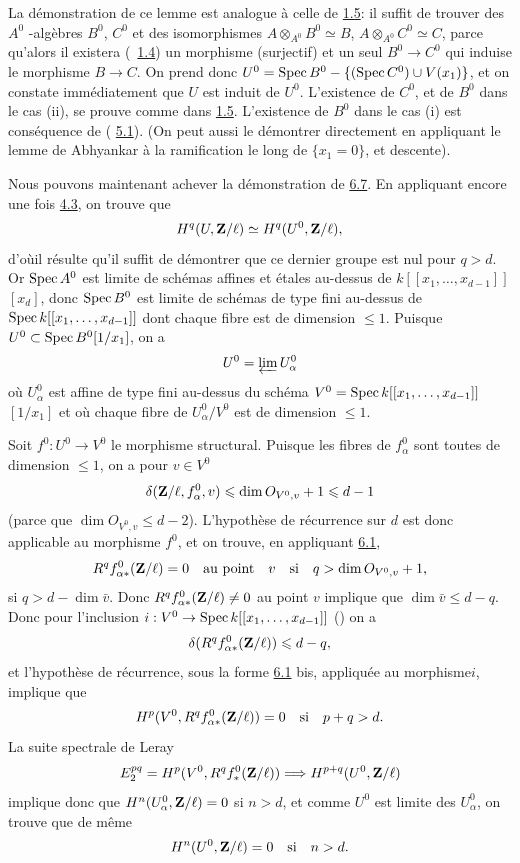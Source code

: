 \documentclass[10pt]{../fichiers-configuration-latex/smfart}
\begin{document}
La démonstration de ce lemme est analogue à celle de \hyperref[XIX.lem1.5]{1.5}:
il suffit de trouver des $A^{0}$ -algèbres $B^{0}$, $C^{0}$ et des
isomorphismes $A\otimes_{A^{0}}B^{0}\simeq B$,
$A\otimes_{A^{0}}C^{0}\simeq C$, parce qu'alors il existera
(\cite{SGA4-19:3}~\hyperref[XIX.subsec1.4]{1.4}) un morphisme (surjectif) et un seul
$B^{0}\rightarrow C^{0}$ qui induise le morphisme $B\rightarrow C$. On
prend donc $U^{0}=\operatorname{Spec} B^{0}-\{(\operatorname{Spec} C^{0})\cup V(x_{1})\}$, et on
constate immédiatement que $U$ est induit de $U^{0}$. L'existence de
$C^{0}$, et de $B^{0}$ dans le cas (ii), se prouve comme dans
\hyperref[XIX.lem1.5]{1.5}. L'existence de $B^{0}$ dans le cas (i) est
conséquence de (\cite{SGA4-19:3} 
\hyperref[XIX.thm5.1]{5.1}). (On peut aussi le démontrer directement en
appliquant le lemme 
de Abhyankar à la ramification le long de $\{x_{1}=0\}$, et descente).

Nous pouvons maintenant achever la démonstration de
\hyperref[XIX.lem6.7]{6.7}. En appliquant 
encore une fois \hyperref[XIX.cor4.3]{4.3}, on trouve que
$$
H^{q}(U,\mathbf{Z}/\ell)\simeq H^{q}(U^{0},\mathbf{Z}/\ell){},
$$
d'où\pageoriginale il résulte qu'il suffit de démontrer que ce dernier
groupe est nul pour $q>d$. Or $\operatorname{Spec} A^{0}$ est limite de schémas
affines et étales au-dessus de $k[[x_{1},\ldots,x_{d-1}]]$ $[x_{d}]$,
donc $\operatorname{Spec} B^{0}$ est limite de schémas de type fini au-dessus de
$\operatorname{Spec} k[[x_{1},\dots,x_{d-1}]]$ dont chaque fibre est de dimension
$\leq 1$. Puisque $U^{0}\subset \operatorname{Spec} B^{0}[1/x_{1}]$, on a
$$
U^{0}=\varprojlim U^{0}_{\alpha}
$$
où $U^{0}_{\alpha}$ est affine de type fini au-dessus du schéma
$V^{0}=\operatorname{Spec} k[[x_{1},\dots, x_{d-1}]]$ $[1/x_{1}]$ et où chaque
fibre de $U^{0}_{\alpha}/V^{0}$ est de dimension $\leq 1$.

Soit $f^{0}:U^{0}\rightarrow V^{0}$ le morphisme structural. Puisque
les fibres de $f^{0}_{\alpha}$ sont toutes de dimension $\leq 1$, on a
pour $v\in V^{0}$
$$
\delta(\mathbf{Z}/\ell, f^{0}_{\alpha},v)\leqslant \dim O_{V^{0},v}+1\leqslant
d-1
$$
(parce que $\dim O_{V^{0},v}\leq d-2$). L'hypothèse de récurrence sur
$d$ est donc applicable au morphisme $f^{0}$, et on trouve, en
appliquant \hyperref[XIX.thm6.1]{6.1},
$$
R^{q}f^{0}_{\alpha\ast}(\mathbf{Z}/\ell)=0\quad\text{\rm au
point}\quad v\quad\text{\rm si}\quad q>\dim O_{V^{0},v}+1{},
$$
\ie si $q>d-\dim\bar{v}$. Donc $R^{q}f^{0}_{\alpha
\ast}(\mathbf{Z}/\ell)\neq 0$ au point $v$ implique que $\dim
\bar{v}\leq d-q$. Donc pour l'inclusion $i:V^{0}\rightarrow \operatorname{Spec}
k[[x_{1},\dots, x_{d-1}]]$ (\cf {}) on a
$$
\delta (R^{q}f^{0}_{\alpha\ast}(\mathbf{Z}/\ell))\leqslant d-q{},
$$
et l'hypothèse de récurrence, sous la forme \hyperref[XIX.thm6.1]{6.1} bis, appliquée au
morphisme\pageoriginale $i$, implique que
$$
H^{p}(V^{0},R^{q}f^{0}_{\alpha\ast}(\mathbf{Z}/\ell))=0\quad\text{\rm
si}\quad p+q>d{}.
$$
La suite spectrale de Leray
$$
E^{pq}_{2}=H^{p}(V^{0},R^{q}f^{0}_{\ast}(\mathbf{Z}/\ell))\Longrightarrow
H^{p+q}(U^{0},\mathbf{Z}/\ell)
$$
implique donc que $H^{n}(U^{0}_{\alpha},\mathbf{Z}/\ell)=0$ si $n>d$,
et comme $U^{0}$ est limite des $U^{0}_{\alpha}$, on trouve que de
même
$$
H^{n}(U^{0},\mathbf{Z}/\ell)=0\quad\text{\rm si}\quad n>d{}.
$$
\end{document}
